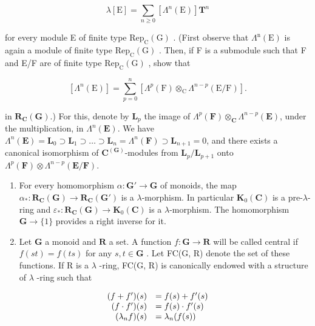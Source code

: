 \[
\lambda [ \mathrm{E} ] = \sum_ {n \geqslant 0} \left[ \Lambda ^ {n} (\mathrm{E}) \right] \mathbf {T} ^ {n}
\]

for every module E of finite type \(\mathrm{Rep}_{\mathrm{C}}(\mathrm{G})\) . (First observe that \(\Lambda^{\mathrm{n}}(\mathrm{E})\) is again a module of finite type \(\mathrm{Rep}_{\mathrm{C}}(\mathrm{G})\) . Then, if F is a submodule such that F and E/F are of finite type \(\mathrm{Rep}_{\mathrm{C}}(\mathrm{G})\) , show that

\[
\left[ \Lambda ^ {n} (\mathrm{E}) \right] = \sum_ {p = 0} ^ {n} \left[ \Lambda ^ {p} (\mathrm{F}) \otimes_ {\mathrm{C}} \Lambda ^ {n - p} (\mathrm{E/F}) \right].
\]

in \(\mathbf{R}_{\mathbf{C}}(\mathbf{G})\).) For this, denote by \(\mathbf{L}_p\) the image of \(\Lambda^p(\mathbf{F}) \otimes_{\mathbf{C}} \Lambda^{n-p}(\mathbf{E})\), under the multiplication, in \(\Lambda^n(\mathbf{E})\). We have \(\Lambda^n(\mathbf{E}) = \mathbf{L}_0 \supset \mathbf{L}_1 \supset \ldots \supset \mathbf{L}_n = \Lambda^n(\mathbf{F}) \supset \mathbf{L}_{n+1} = 0\), and there exists a canonical isomorphism of \(\mathbf{C}^{(\mathbf{G})}\)-modules from \(\mathbf{L}_p / \mathbf{L}_{p+1}\) onto \(\Lambda^p(\mathbf{F}) \otimes \Lambda^{n-p}(\mathbf{E}/\mathbf{F})\).

\begin{enumerate}
\def\labelenumi{\alph{enumi})}
\setcounter{enumi}{1}
\item
  For every homomorphism \(\alpha: \mathbf{G}' \to \mathbf{G}\) of monoids, the map \(\alpha_*: \mathbf{R}_{\mathbf{C}}(\mathbf{G}) \to \mathbf{R}_{\mathbf{C}}(\mathbf{G}')\) is a \(\lambda\)-morphism. In particular \(\mathbf{K}_0(\mathbf{C})\) is a pre-\(\lambda\)-ring and \(\varepsilon_*: \mathbf{R}_{\mathbf{C}}(\mathbf{G}) \to \mathbf{K}_0(\mathbf{C})\) is a \(\lambda\)-morphism. The homomorphism \(\mathbf{G} \to \{1\}\) provides a right inverse for it.
\item
  Let \(\mathbf{G}\) a monoid and \(\mathbf{R}\) a set. A function \(f: \mathbf{G} \to \mathbf{R}\) will be called central if \(f(st) = f(ts)\) for any \(s, t \in \mathbf{G}\) . Let FC(G, R) denote the set of these functions. If R is a \(\lambda\) -ring, FC(G, R) is canonically endowed with a structure of \(\lambda\) -ring such that
\end{enumerate}

\[
\begin{array}{r l} (f + f ^ {\prime}) (s) & = f (s) + f ^ {\prime} (s) \\ (f \cdot f ^ {\prime}) (s) & = f (s) \cdot f ^ {\prime} (s) \\ (\lambda_ {n} f) (s) & = \lambda_ {n} (f (s)) \end{array}
\]

